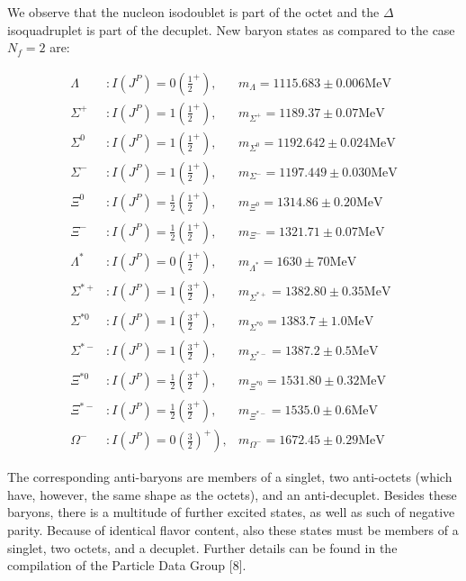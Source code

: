 \documentclass[10pt, letterpaper]{article}
\begin{document}
We observe that the nucleon isodoublet is part of the octet and the $\Delta$ isoquadruplet is part of the decuplet. New baryon states as compared to the case $N_{f}=2$ are:

$$
\begin{array}{rll}
\Lambda & : I\left(J^{P}\right)=0\left(\frac{1}{2}^{+}\right), & m_{\Lambda}=1115.683 \pm 0.006 \mathrm{MeV} \\
\Sigma^{+} & : I\left(J^{P}\right)=1\left(\frac{1}{2}^{+}\right), & m_{\Sigma^{+}}=1189.37 \pm 0.07 \mathrm{MeV} \\
\Sigma^{0} & : I\left(J^{P}\right)=1\left(\frac{1}{2}^{+}\right), & m_{\Sigma^{0}}=1192.642 \pm 0.024 \mathrm{MeV} \\
\Sigma^{-} & : I\left(J^{P}\right)=1\left(\frac{1}{2}^{+}\right), & m_{\Sigma^{-}}=1197.449 \pm 0.030 \mathrm{MeV} \\
\Xi^{0} & : I\left(J^{P}\right)=\frac{1}{2}\left(\frac{1}{2}^{+}\right), & m_{\Xi^{0}}=1314.86 \pm 0.20 \mathrm{MeV} \\
\Xi^{-} & : I\left(J^{P}\right)=\frac{1}{2}\left(\frac{1}{2}^{+}\right), & m_{\Xi^{-}}=1321.71 \pm 0.07 \mathrm{MeV} \\
\Lambda^{*} & : I\left(J^{P}\right)=0\left(\frac{1}{2}^{+}\right), & m_{\Lambda^{*}}=1630 \pm 70 \mathrm{MeV} \\
\Sigma^{*+} & : I\left(J^{P}\right)=1\left(\frac{3}{2}^{+}\right), & m_{\Sigma^{*+}}=1382.80 \pm 0.35 \mathrm{MeV} \\
\Sigma^{* 0} & : I\left(J^{P}\right)=1\left(\frac{3}{2}^{+}\right), & m_{\Sigma^{* 0}}=1383.7 \pm 1.0 \mathrm{MeV} \\
\Sigma^{*-} & : I\left(J^{P}\right)=1\left(\frac{3}{2}^{+}\right), & m_{\Sigma^{*-}}=1387.2 \pm 0.5 \mathrm{MeV} \\
\Xi^{* 0} & : I\left(J^{P}\right)=\frac{1}{2}\left(\frac{3}{2}^{+}\right), & m_{\Xi^{* 0}}=1531.80 \pm 0.32 \mathrm{MeV} \\
\Xi^{*-} & : I\left(J^{P}\right)=\frac{1}{2}\left(\frac{3}{2}^{+}\right), & m_{\Xi^{*-}}=1535.0 \pm 0.6 \mathrm{MeV} \\
\Omega^{-} & \left.: I\left(J^{P}\right)=0\left(\frac{3}{2}\right)^{+}\right), & m_{\Omega^{-}}=1672.45 \pm 0.29 \mathrm{MeV}
\end{array}
$$

The corresponding anti-baryons are members of a singlet, two anti-octets (which have, however, the same shape as the octets), and an anti-decuplet. Besides these baryons, there is a multitude of further excited states, as well as such of negative parity. Because of identical flavor content, also these states must be members of a singlet, two octets, and a decuplet. Further details can be found in the compilation of the Particle Data Group [8].
\end{document}
